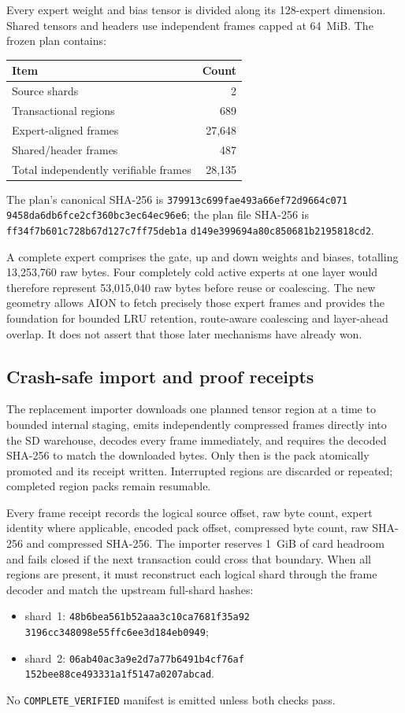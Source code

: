Every expert weight and bias tensor is divided along its 128-expert dimension.
Shared tensors and headers use independent frames capped at 64~MiB.  The frozen
plan contains:
\begin{center}
\begin{tabular}{lr}
\toprule
Item & Count \\
\midrule
Source shards & 2 \\
Transactional regions & 689 \\
Expert-aligned frames & 27,648 \\
Shared/header frames & 487 \\
Total independently verifiable frames & 28,135 \\
\bottomrule
\end{tabular}
\end{center}
The plan's canonical SHA-256 is
\texttt{379913c699fae493a66ef72d9664c071}%
\allowbreak\texttt{9458da6db6fce2cf360bc3ec64ec96e6};
the plan file SHA-256 is
\texttt{ff34f7b601c728b67d127c7ff75deb1a}%
\allowbreak\texttt{d149e399694a80c850681b2195818cd2}.

A complete expert comprises the gate, up and down weights and biases, totalling
13,253,760 raw bytes.  Four completely cold active experts at one layer would
therefore represent 53,015,040 raw bytes before reuse or coalescing.  The new
geometry allows AION to fetch precisely those expert frames and provides the
foundation for bounded LRU retention, route-aware coalescing and layer-ahead
overlap.  It does not assert that those later mechanisms have already won.

\subsection{Crash-safe import and proof receipts}

The replacement importer downloads one planned tensor region at a time to
bounded internal staging, emits independently compressed frames directly into
the SD warehouse, decodes every frame immediately, and requires the decoded
SHA-256 to match the downloaded bytes.  Only then is the pack atomically
promoted and its receipt written.  Interrupted regions are discarded or
repeated; completed region packs remain resumable.

Every frame receipt records the logical source offset, raw byte count, expert
identity where applicable, encoded pack offset, compressed byte count, raw
SHA-256 and compressed SHA-256.  The importer reserves 1~GiB of card headroom
and fails closed if the next transaction could cross that boundary.  When all
regions are present, it must reconstruct each logical shard through the frame
decoder and match the upstream full-shard hashes:
\begin{itemize}
  \item shard~1:
  \texttt{48b6bea561b52aaa3c10ca7681f35a92}%
  \allowbreak\texttt{3196cc348098e55ffc6ee3d184eb0949};
  \item shard~2:
  \texttt{06ab40ac3a9e2d7a77b6491b4cf76af}%
  \allowbreak\texttt{152bee88ce493331a1f5147a0207abcad}.
\end{itemize}
No \texttt{COMPLETE\_VERIFIED} manifest is emitted unless both checks pass.

